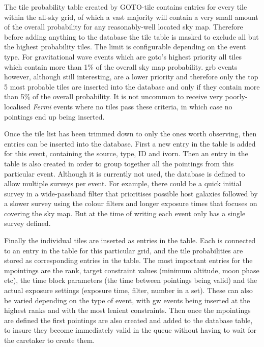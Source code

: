 \begin{colsection}
\begin{colsection}
The tile probability table created by GOTO-tile contains entries for every tile within the all-sky grid, of which a vast majority will contain a very small amount of the overall probability for any reasonably-well located sky map. Therefore before adding anything to the database the tile table is masked to exclude all but the highest probability tiles. The limit is configurable depending on the event type. For gravitational wave events which are \gls{goto}'s highest priority all tiles which contain more than 1\% of the overall sky map probability. \gls{grb} events however, although still interesting, are a lower priority and therefore only the top 5 most probable tiles are inserted into the database and only if they contain more than 5\% of the overall probability. It is not uncommon to receive very poorly-localised \textit{Fermi} events where no tiles pass these criteria, in which case no pointings end up being inserted.

Once the tile list has been trimmed down to only the ones worth observing, then entries can be inserted into the database. First a new entry in the  table is added for this event, containing the source, type, ID and \gls{ivorn}. Then an entry in the  table is also created in order to group together all the pointings from this particular event. Although it is currently not used, the database is defined to allow multiple surveys per event. For example, there could be a quick initial survey in a wide-passband filter that prioritises possible host galaxies followed by a slower survey using the colour filters and longer exposure times that focuses on covering the sky map. But at the time of writing each event only has a single survey defined.

Finally the individual tiles are inserted as entries in the  table. Each is connected to an entry in the  table for this particular grid, and the tile probabilities are stored as corresponding entries in the  table. The most important entries for the mpointings are the rank, target constraint values (minimum altitude, moon phase etc), the time block parameters (the time between pointings being valid) and the actual exposure settings (exposure time, filter, number in a set). These can also be varied depending on the type of event, with \gls{gw} events being inserted at the highest ranks and with the most lenient constraints. Then once the mpointings are defined the first pointings are also created and added to the database  table, to insure they become immediately valid in the queue without having to wait for the caretaker to create them.


\end{colsection}
\end{colsection}
